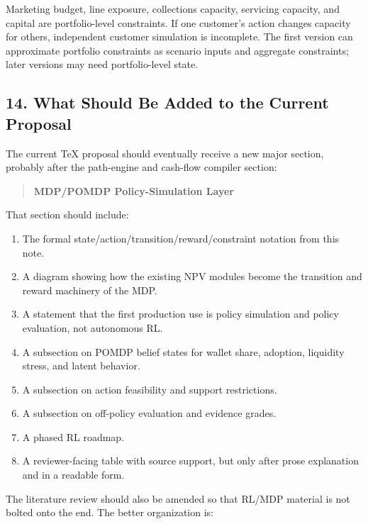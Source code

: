 \documentclass[
]{article}
\providecommand{\tightlist}{%
  \setlength{\itemsep}{0pt}\setlength{\parskip}{0pt}}
\begin{document}
Marketing budget, line exposure, collections capacity, servicing
capacity, and capital are portfolio-level constraints. If one customer's
action changes capacity for others, independent customer simulation is
incomplete. The first version can approximate portfolio constraints as
scenario inputs and aggregate constraints; later versions may need
portfolio-level state.

\hypertarget{what-should-be-added-to-the-current-proposal}{%
\subsection{14. What Should Be Added to the Current
Proposal}\label{what-should-be-added-to-the-current-proposal}}

The current TeX proposal should eventually receive a new major section,
probably after the path-engine and cash-flow compiler section:

\begin{quote}
\textbf{MDP/POMDP Policy-Simulation Layer}
\end{quote}

That section should include:

\begin{enumerate}
\def\labelenumi{\arabic{enumi}.}
\tightlist
\item
  The formal state/action/transition/reward/constraint notation from
  this note.
\item
  A diagram showing how the existing NPV modules become the transition
  and reward machinery of the MDP.
\item
  A statement that the first production use is policy simulation and
  policy evaluation, not autonomous RL.
\item
  A subsection on POMDP belief states for wallet share, adoption,
  liquidity stress, and latent behavior.
\item
  A subsection on action feasibility and support restrictions.
\item
  A subsection on off-policy evaluation and evidence grades.
\item
  A phased RL roadmap.
\item
  A reviewer-facing table with source support, but only after prose
  explanation and in a readable form.
\end{enumerate}

The literature review should also be amended so that RL/MDP material is
not bolted onto the end. The better organization is:
\end{document}
